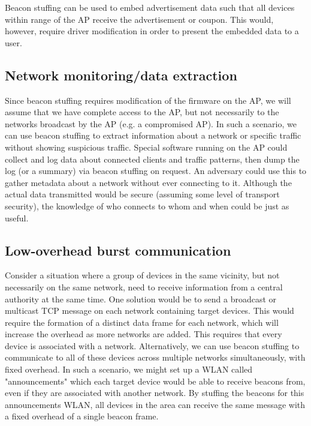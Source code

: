 \documentclass[letterpaper, 10 pt, conference]{ieeeconf}  %
\begin{document}
Beacon stuffing can be used to embed advertisement data such that all devices within range of the AP receive the advertisement or coupon.  This would, however, require driver modification in order to present the embedded data to a user.

\subsection{Network monitoring/data extraction}

Since beacon stuffing requires modification of the firmware on the AP, we will assume that we have complete access to the AP, but not necessarily to the networks broadcast by the AP (e.g. a compromised AP).  In such a scenario, we can use beacon stuffing to extract information about a network or specific traffic without showing suspicious traffic.  Special software running on the AP could collect and log data about connected clients and traffic patterns, then dump the log (or a summary) via beacon stuffing on request.  An adversary could use this to gather metadata about a network without ever connecting to it.  Although the actual data transmitted would be secure (assuming some level of transport security), the knowledge of who connects to whom and when could be just as useful.

\subsection{Low-overhead burst communication}

Consider a situation where a group of devices in the same vicinity, but not necessarily on the same network, need to receive information from a central authority at the same time.  One solution would be to send a broadcast or multicast TCP message on each network containing target devices.  This would require the formation of a distinct data frame for each network, which will increase the overhead as more networks are added.  This requires that every device is associated with a network.  Alternatively, we can use beacon stuffing to communicate to all of these devices across multiple networks simultaneously, with fixed overhead.  In such a scenario, we might set up a WLAN called "announcements" which each target device would be able to receive beacons from, even if they are associated with another network.  By stuffing the beacons for this announcements WLAN, all devices in the area can receive the same message with a fixed overhead of a single beacon frame.
\end{document}
